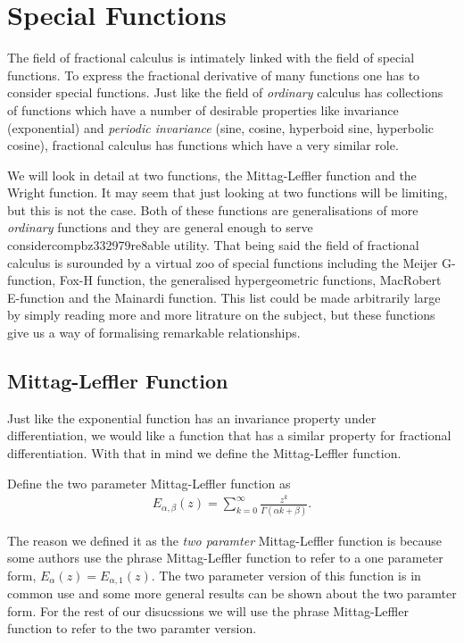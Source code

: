 
\section{Special Functions}

The field of fractional calculus is intimately linked with the field of special functions. To express the fractional derivative
of many functions one has to consider special functions. Just like the field of \emph{ordinary} calculus has collections of functions which have a number of desirable properties like invariance (exponential) and \emph{periodic invariance} (sine, cosine, hyperboid sine, hyperbolic cosine), fractional calculus has functions which have a very similar role.

We will look in detail at two functions, the Mittag-Leffler function and the Wright function. It may seem that just looking at two functions will be limiting, but this is not the case. Both of these functions are generalisations of more \emph{ordinary} functions and they are general enough to serve considercompbz332979re8able utility. That being said the field of fractional calculus is surounded by a virtual zoo of special functions including the Meijer G-function, Fox-H function, the generalised hypergeometric functions, MacRobert E-function and the Mainardi function. This list could be made arbitrarily large by simply reading more and more litrature on the subject, but these functions give us a way of formalising remarkable relationships.

\subsection{Mittag-Leffler Function}

Just like the exponential function has an invariance property under differentiation, we would like a function that has a similar property for fractional differentiation. With that in mind we define the Mittag-Leffler function.
\begin{mdframed}[innertopmargin=10pt]
\begin{definition}
    Define the two parameter Mittag-Leffler function as
    \begin{align}
        E_{\alpha, \beta}(z) = \sum_{k=0}^\infty \frac{z^k}{\Gamma(\alpha k + \beta)}.
    \end{align}
\end{definition}
\end{mdframed}
The reason we defined it as the \emph{two paramter} Mittag-Leffler function is because some authors use the phrase Mittag-Leffler function to refer to a one parameter form, $ E_{\alpha}(z) = E_{\alpha, 1}(z) $. The two parameter version of this function is in common use and some more general results can be shown about the two paramter form. For the rest of our disucssions we will use the phrase Mittag-Leffler function to refer to the two paramter version.

